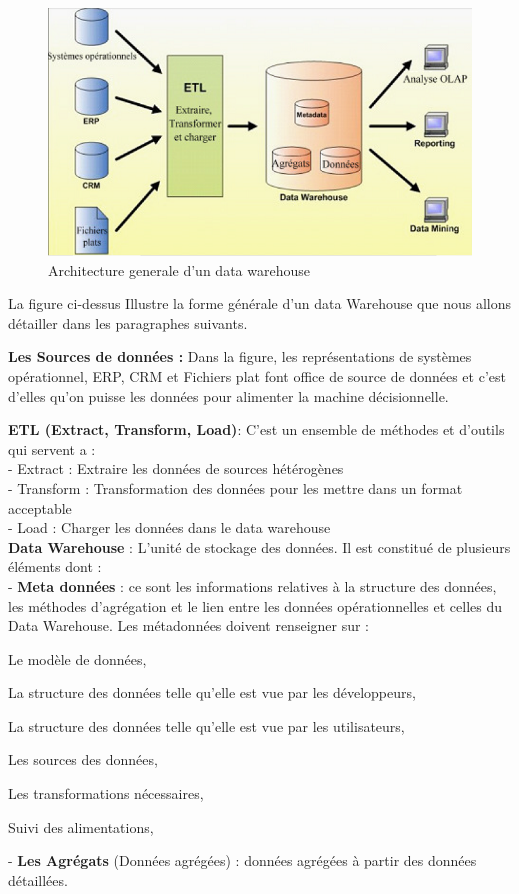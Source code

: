  	\begin{figure}[h]
	\begin{center}
		\includegraphics[scale=0.85]{images/DataWH.png}
		\caption{Architecture generale d'un data warehouse}
		\label{architecture-data-warehouse}
	\end{center}
\end{figure}

La figure ci-dessus Illustre la forme générale d’un data Warehouse que nous allons détailler dans les paragraphes suivants.

\textbf{Les Sources de données :} Dans la figure, les représentations de systèmes opérationnel, ERP, CRM et Fichiers plat font office de source de données et c’est d’elles qu’on puisse les données pour alimenter la machine décisionnelle.

\textbf{ETL (Extract, Transform, Load)}: C’est un ensemble de méthodes et d’outils qui servent a :\\
-	Extract : Extraire les données de sources hétérogènes\\
-	Transform : Transformation des données pour les mettre dans un format acceptable\\
-	Load : Charger les données dans le data warehouse\\

\textbf{Data Warehouse} : L’unité de stockage des données. Il est constitué de plusieurs éléments dont :\\ 
-	\textbf{Meta données} : ce sont les informations relatives à la structure des données, les méthodes d’agrégation et le lien entre les données opérationnelles et celles du Data Warehouse. Les métadonnées doivent renseigner sur :
 \begin{description}
 \item Le modèle de données,
 \item La structure des données telle qu’elle est vue par les développeurs,
 \item La structure des données telle qu’elle est vue par les utilisateurs,
 \item Les sources des données,
 \item Les transformations nécessaires,
 \item Suivi des alimentations,
 \end{description}
-	\textbf{Les Agrégats} (Données agrégées) : données agrégées à partir des données détaillées.\\

